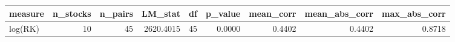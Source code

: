 \begin{tabular}{lrrrrrrrr}
\toprule
measure & n_stocks & n_pairs & LM_stat & df & p_value & mean_corr & mean_abs_corr & max_abs_corr \\
\midrule
log(RK) & 10 & 45 & 2620.4015 & 45 & 0.0000 & 0.4402 & 0.4402 & 0.8718 \\
\bottomrule
\end{tabular}
